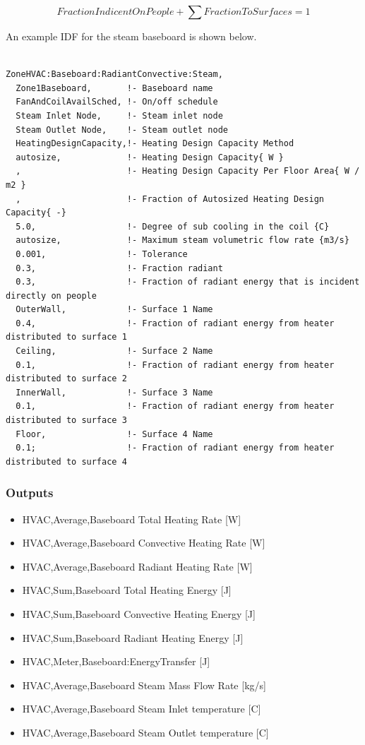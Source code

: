 \begin{equation}
FractionIndicentOnPeople + \sum {FractionToSurfaces = 1}
\end{equation}

An example IDF for the steam baseboard is shown below.

\begin{lstlisting}

ZoneHVAC:Baseboard:RadiantConvective:Steam,
  Zone1Baseboard,       !- Baseboard name
  FanAndCoilAvailSched, !- On/off schedule
  Steam Inlet Node,     !- Steam inlet node
  Steam Outlet Node,    !- Steam outlet node
  HeatingDesignCapacity,!- Heating Design Capacity Method
  autosize,             !- Heating Design Capacity{ W }
  ,                     !- Heating Design Capacity Per Floor Area{ W / m2 }
  ,                     !- Fraction of Autosized Heating Design Capacity{ -}
  5.0,                  !- Degree of sub cooling in the coil {C}
  autosize,             !- Maximum steam volumetric flow rate {m3/s}
  0.001,                !- Tolerance
  0.3,                  !- Fraction radiant
  0.3,                  !- Fraction of radiant energy that is incident directly on people
  OuterWall,            !- Surface 1 Name
  0.4,                  !- Fraction of radiant energy from heater distributed to surface 1
  Ceiling,              !- Surface 2 Name
  0.1,                  !- Fraction of radiant energy from heater distributed to surface 2
  InnerWall,            !- Surface 3 Name
  0.1,                  !- Fraction of radiant energy from heater distributed to surface 3
  Floor,                !- Surface 4 Name
  0.1;                  !- Fraction of radiant energy from heater distributed to surface 4
\end{lstlisting}

\subsubsection{Outputs}\label{outputs-1-021}

\begin{itemize}
\item
  HVAC,Average,Baseboard Total Heating Rate {[}W{]}
\item
  HVAC,Average,Baseboard Convective Heating Rate {[}W{]}
\item
  HVAC,Average,Baseboard Radiant Heating Rate {[}W{]}
\item
  HVAC,Sum,Baseboard Total Heating Energy {[}J{]}
\item
  HVAC,Sum,Baseboard Convective Heating Energy {[}J{]}
\item
  HVAC,Sum,Baseboard Radiant Heating Energy {[}J{]}
\item
  HVAC,Meter,Baseboard:EnergyTransfer {[}J{]}
\item
  HVAC,Average,Baseboard Steam Mass Flow Rate {[}kg/s{]}
\item
  HVAC,Average,Baseboard Steam Inlet temperature {[}C{]}
\item
  HVAC,Average,Baseboard Steam Outlet temperature {[}C{]}
\end{itemize}

